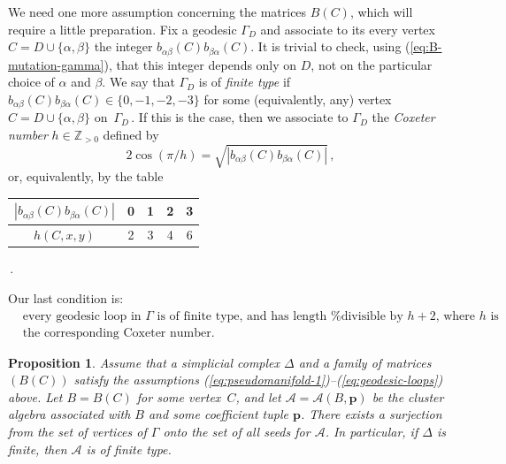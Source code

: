 \documentclass[letterpaper]{amsart}
\numberwithin{equation}{section}
\newtheorem{proposition}[theorem]{Proposition}
\theoremstyle{definition}
\def\AA{\mathcal{A}}
\def\ZZ{\mathbb{Z}}
\def\pp{\mathbf{p}}
\begin{document}
We %
need one more assumption concerning the matrices $B(C)$, which 
will require a little preparation. Fix a geodesic $\Gamma_D$ and 
associate to its every vertex $C = D \cup \{\alpha, \beta\}$ the 
integer $b_{\alpha\beta}(C) b_{\beta\alpha}(C)$. It is trivial to 
check, using (\ref{eq:B-mutation-gamma}), that this integer 
depends only on $D$, not on the particular choice of $\alpha$ and 
$\beta$. We say that $\Gamma_D$ is of \emph{finite type} if 
$b_{\alpha\beta}(C) b_{\beta\alpha}(C) \in \{0,-1,-2,-3\}$ for 
some (equivalently, any) vertex $C = D \cup \{\alpha, \beta\}$ 
on~$\Gamma_D\,$. 
If this is the case, then we associate to $\Gamma_D$ the \emph{Coxeter number} 
$h\in\ZZ_{>0}$ defined by 
\[ 
2 \cos (\pi/h) = 
\sqrt{|b_{\alpha\beta}(C) b_{\beta\alpha}(C)|} 
\,, 
\] 
or, equivalently, by the table 
\begin{center} 
\begin{tabular}{|c|c|c|c|c|} 
\hline 
$|b_{\alpha\beta}(C) b_{\beta\alpha}(C)|$ & 0 & 1 & 2 & 3 \\ 
\hline 
$h(C,x,y) $ & 2 & 3 & 4 & 6 \\ 
\hline 
\end{tabular} \,. 
\end{center} 
 
Our last condition is: 
\begin{align} 
\label{eq:geodesic-loops} 
&\text{every geodesic loop in $\Gamma$ is of finite type, 
and has length %
$h+ 2$, where $h$ is} %
\\ 
\nonumber 
&\text{the corresponding Coxeter number.} 
\end{align} 
 
 
\begin{proposition} 
\label{prop:finite-type-criterion} 
Assume that a simplicial complex $\Delta$ and a family of matrices 
$(B(C))$  satisfy the assumptions 
{\rm(\ref{eq:pseudomanifold-1})--(\ref{eq:geodesic-loops})} above. 
Let $B=B(C)$ for some vertex~$C$, and let $\AA = \AA(B,\pp)$ be the cluster algebra associated 
with $B$ 
and some coefficient tuple $\pp$. There exists a surjection from 
the set 
of vertices of $\Gamma$ onto the set of all seeds for $\AA$. In 
particular, if $\Delta$ is finite, then $\AA$ is of finite type. 
\end{proposition} 
 
\end{document}

